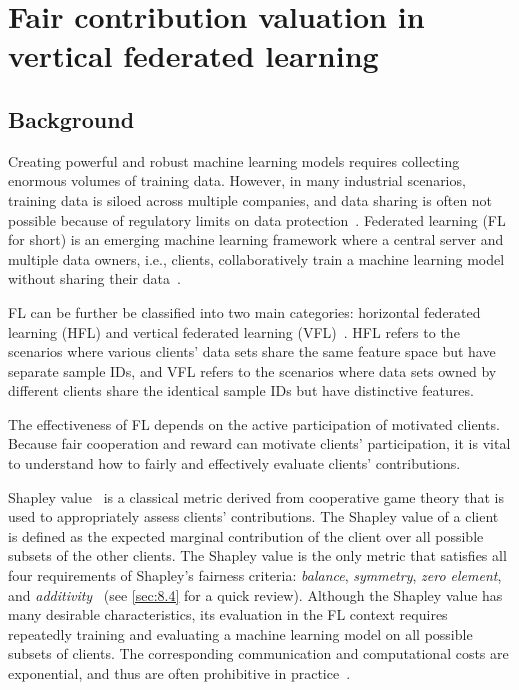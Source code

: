 \chapter{Fair contribution valuation in vertical federated
learning}
\label{ch:Val-VFL}

\section{Background} \label{sec:8.1}
Creating powerful and robust machine learning models requires collecting enormous volumes of training data. However, in many industrial scenarios, training data is siloed across multiple companies, and data sharing is often not possible because of regulatory limits on data protection~\cite{li2020review}. Federated learning (FL for short) is an emerging machine learning framework where a central server and multiple data owners, i.e., clients, collaboratively train a machine learning model without sharing their data~\cite{mcmahan2017communication,yang2019federated,kairouz2019advances}. 

FL can be further be classified into two main categories: horizontal federated learning (HFL) and vertical federated learning (VFL)~\cite{yang2019federated}. HFL refers to the scenarios where various clients' data sets share the same feature space but have separate sample IDs, and VFL refers to the scenarios where data sets owned by different clients share the identical sample IDs but have distinctive features.

The effectiveness of FL depends on the active participation of motivated clients. Because fair cooperation and reward can motivate clients' participation, it is vital to understand how to fairly and effectively evaluate clients' contributions.

Shapley value~\cite{shapley201617} is a classical metric derived from cooperative game theory that is used to appropriately assess clients' contributions. The Shapley value of a client is defined as the expected marginal contribution of the client over all possible subsets of the other clients. The Shapley value is the only metric that satisfies all four requirements of Shapley's fairness criteria: \emph{balance}, \emph{symmetry}, \emph{zero element}, and \emph{additivity}~\cite{dubey1975uniqueness} (see \autoref{sec:8.4} for a quick review).  Although the Shapley value has many desirable characteristics, its evaluation in the FL context requires repeatedly training and evaluating a machine learning model on all possible subsets of clients. The corresponding communication and computational costs are exponential, and thus are often prohibitive in practice~\cite{song2019profit,wang2019measure,fan2021improving}. 


